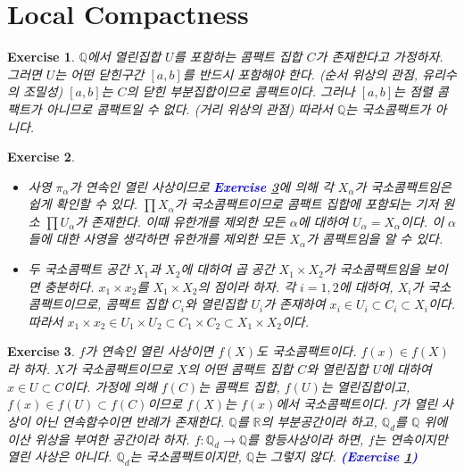 \documentclass{article}
\newtheorem{exercise}{Exercise}[section]
\newcommand{\Q}{\mathbb{Q}}
\newcommand{\R}{\mathbb{R}}
\begin{document}
\section{Local Compactness}

\begin{exercise}
	\label{exc:29.1}
    $\Q$에서 열린집합 $U$를 포함하는 콤팩트 집합 $C$가 존재한다고 가정하자. 그러면 $U$는 어떤 닫힌구간 $[a,b]$를 반드시 포함해야 한다. (순서 위상의 관점, 유리수의 조밀성) $[a,b]$는 $C$의 닫힌 부분집합이므로 콤팩트이다. 그러나 $[a,b]$는 점렬 콤팩트가 아니므로 콤팩트일 수 없다. (거리 위상의 관점) 따라서 $\Q$는 국소콤팩트가 아니다.
\end{exercise}

\begin{exercise}
    \phantom{}
    \begin{itemize}
        \item[(a)] 사영 $\pi_\alpha$가 연속인 열린 사상이므로 \textcolor{blue}{\textbf{Exercise \ref{exc:29.3}}}에 의해 각 $X_\alpha$가 국소콤팩트임은 쉽게 확인할 수 있다. $\prod X_\alpha$가 국소콤팩트이므로 콤팩트 집합에 포함되는 기저 원소 $\prod U_\alpha$가 존재한다. 이때 유한개를 제외한 모든 $\alpha$에 대하여 $U_\alpha=X_\alpha$이다. 이 $\alpha$들에 대한 사영을 생각하면 유한개를 제외한 모든 $X_\alpha$가 콤팩트임을 알 수 있다. 
        \item[(b)] 두 국소콤팩트 공간 $X_1$과 $X_2$에 대하여 곱 공간 $X_1\times X_2$가 국소콤팩트임을 보이면 충분하다. $x_1\times x_2$를 $X_1\times X_2$의 점이라 하자. 각 $i=1,2$에 대하여, $X_i$가 국소콤팩트이므로, 콤팩트 집합 $C_i$와 열린집합 $U_i$가 존재하여 $x_i\in U_i\subset C_i\subset X_i$이다. 따라서 $x_1\times x_2\in U_1\times U_2\subset C_1\times C_2\subset X_1\times X_2$이다.
    \end{itemize}
\end{exercise}

\begin{exercise}
	\label{exc:29.3}
    $f$가 연속인 열린 사상이면 $f(X)$도 국소콤팩트이다. $f(x)\in f(X)$라 하자. $X$가 국소콤팩트이므로 $X$의 어떤 콤팩트 집합 $C$와 열린집합 $U$에 대하여 $x\in U\subset C$이다. 가정에 의해 $f(C)$는 콤팩트 집합, $f(U)$는 열린집합이고, $f(x)\in f(U)\subset f(C)$이므로 $f(X)$는 $f(x)$에서 국소콤팩트이다. $f$가 열린 사상이 아닌 연속함수이면 반례가 존재한다. $\Q$를 $\R$의 부분공간이라 하고, $\Q_d$를 $\Q$ 위에 이산 위상을 부여한 공간이라 하자. $f:\Q_d\to\Q$를 항등사상이라 하면, $f$는 연속이지만 열린 사상은 아니다. $\Q_d$는 국소콤팩트이지만, $\Q$는 그렇지 않다. \textcolor{blue}{\textbf{(Exercise \ref{exc:29.1})}}
\end{exercise}
\end{document}
